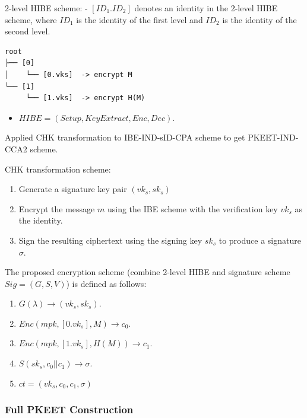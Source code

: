 \documentclass[
]{article}
\providecommand{\tightlist}{%
  \setlength{\itemsep}{0pt}\setlength{\parskip}{0pt}}
\begin{document}
2-level HIBE scheme: - \([{ID}_1. {ID}_2]\) denotes an identity in the
2-level HIBE scheme, where \({ID}_1\) is the identity of the first level
and \({ID}_2\) is the identity of the second level.

\begin{verbatim}
root
├── [0]
│    └── [0.vks]  -> encrypt M
└── [1]
     └── [1.vks]  -> encrypt H(M)
\end{verbatim}

\begin{itemize}
\tightlist
\item
  \(HIBE=(Setup, KeyExtract,Enc, Dec)\).
\end{itemize}

Applied CHK transformation to IBE-IND-sID-CPA scheme to get
PKEET-IND-CCA2 scheme.

CHK transformation scheme:

\begin{enumerate}
\def\labelenumi{\arabic{enumi}.}
\item
  Generate a signature key pair \(({vk}_s, {sk}_s)\)
\item
  Encrypt the message \(m\) using the IBE scheme with the verification
  key \({vk}_s\) as the identity.
\item
  Sign the resulting ciphertext using the signing key \({sk}_s\) to
  produce a signature \(\sigma\).
\end{enumerate}

The proposed encryption scheme (combine 2-level HIBE and signature
scheme \(Sig =(G,S,V)\)) is defined as follows:

\begin{enumerate}
\def\labelenumi{\arabic{enumi}.}
\item
  \(G(\lambda)\rightarrow ({vk}_s, {sk}_s)\).
\item
  \(Enc(mpk, [0.{vk}_s],M)\rightarrow c_0\).
\item
  \(Enc(mpk, [1.{vk}_s],H(M))\rightarrow c_1\).
\item
  \(S({sk}_s, c_0||c_1)\rightarrow \sigma\).
\item
  \(ct = ({vk}_s, c_0, c_1, \sigma)\)
\end{enumerate}

\hypertarget{full-pkeet-construction}{%
\subsubsection{Full PKEET Construction}\label{full-pkeet-construction}}
\end{document}
